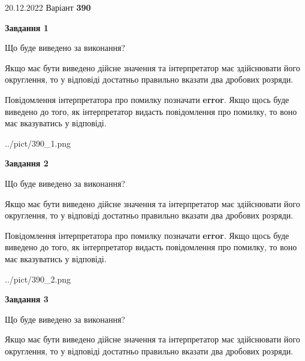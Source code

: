 \documentclass[12pt, ukrainian]{article}
\begin{document}
{20.12.2022 Варіант \No \textbf { 390 }\par}
{
\begin {Large}

{\begin {center}\textbf{Завдання 1}\end {center}}\par
Що буде виведено за виконання? \par

Якщо має бути виведено дійсне значення та інтерпретатор має здійснювати його округлення, 
то у відповіді достатньо правильно вказати два дробових розряди.

Повідомлення інтерпретатора про помилку позначати \textbf{error}.
Якщо щось буде виведено до того, як інтерпретатор видасть повідомлення про помилку, 
то воно має вказуватись у відповіді. \par

\begin{center}
	{../pict/390_1.png}
\end{center}
\newpage

{\begin {center}\textbf{Завдання 2}\end {center}}\par
Що буде виведено за виконання? \par

Якщо має бути виведено дійсне значення та інтерпретатор має здійснювати його округлення, 
то у відповіді достатньо правильно вказати два дробових розряди.

Повідомлення інтерпретатора про помилку позначати \textbf{error}.
Якщо щось буде виведено до того, як інтерпретатор видасть повідомлення про помилку, 
то воно має вказуватись у відповіді. \par

\begin{center}
	{../pict/390_2.png}
\end{center}
\newpage

{\begin {center}\textbf{Завдання 3}\end {center}}\par
Що буде виведено за виконання? \par

Якщо має бути виведено дійсне значення та інтерпретатор має здійснювати його округлення, 
то у відповіді достатньо правильно вказати два дробових розряди.


\end{Large}}
\end{document}
